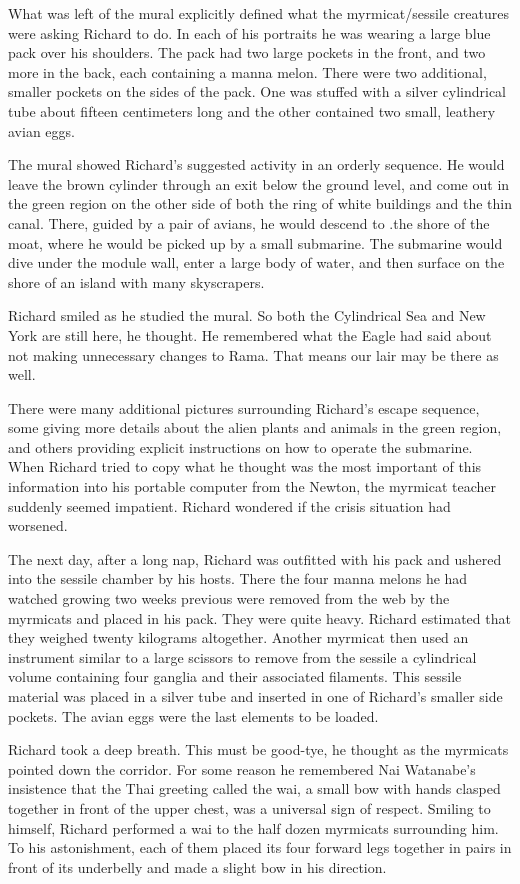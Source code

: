 \documentclass[]{article}
\begin{document}
{{What was left of the mural explicitly defined what the myrmicat/sessile creatures were asking Richard to do. In each of his portraits he was wearing a large blue pack over his shoulders. The pack had two large pockets in the front, and two more in the back, each containing a manna melon. There were two additional, smaller pockets on the sides of the pack. One was stuffed with a silver cylindrical tube about fifteen centimeters long and the other contained two small, leathery avian eggs.

The mural showed Richard’s suggested activity in an orderly sequence. He would leave the brown cylinder through an exit below the ground level, and come out in the green region on the other side of both the ring of white buildings and the thin canal. There, guided by a pair of avians, he would descend to .the shore of the moat, where he would be picked up by a small submarine. The submarine would dive under the module wall, enter a large body of water, and then surface on the shore of an island with many skyscrapers.

Richard smiled as he studied the mural. So both the Cylindrical Sea and New York are still here, he thought. He remembered what the Eagle had said about not making unnecessary changes to Rama. That means our lair may be there as well.

There were many additional pictures surrounding Richard’s escape sequence, some giving more details about the alien plants and animals in the green region, and others providing explicit instructions on how to operate the submarine. When Richard tried to copy what he thought was the most important of this information into his portable computer from the Newton, the myrmicat teacher suddenly seemed impatient. Richard wondered if the crisis situation had worsened.

The next day, after a long nap, Richard was outfitted with his pack and ushered into the sessile chamber by his hosts. There the four manna melons he had watched growing two weeks previous were removed from the web by the myrmicats and placed in his pack. They were quite heavy. Richard estimated that they weighed twenty kilograms altogether. Another myrmicat then used an instrument similar to a large scissors to remove from the sessile a cylindrical volume containing four ganglia and their associated filaments. This sessile material was placed in a silver tube and inserted in one of Richard’s smaller side pockets. The avian eggs were the last elements to be loaded.

Richard took a deep breath. This must be good-tye, he thought as the myrmicats pointed down the corridor. For some reason he remembered Nai Watanabe’s insistence that the Thai greeting called the wai, a small bow with hands clasped together in front of the upper chest, was a universal sign of respect. Smiling to himself, Richard performed a wai to the half dozen myrmicats surrounding him. To his astonishment, each of them placed its four forward legs together in pairs in front of its underbelly and made a slight bow in his direction.

}}
\end{document}
